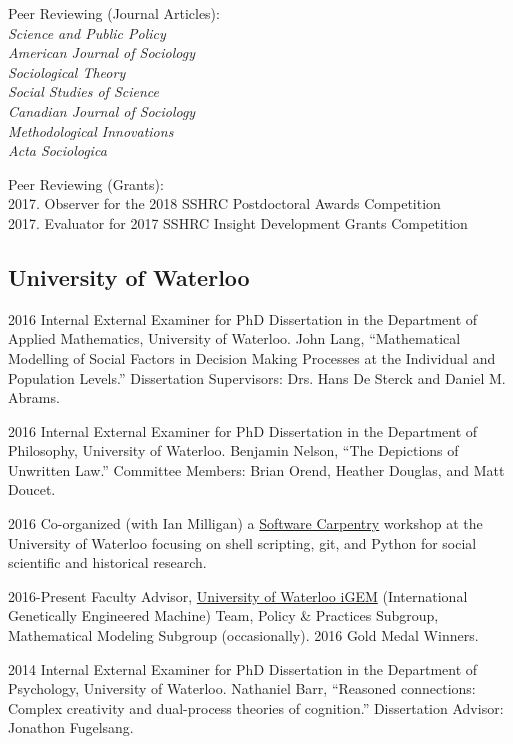 \ind Peer Reviewing (Journal Articles):\\
\emph{Science and Public Policy}\\
\emph{American Journal of Sociology}\\
\emph{Sociological Theory}\\
\emph{Social Studies of Science}\\
\emph{Canadian Journal of Sociology}\\
\emph{Methodological Innovations}\\
\emph{Acta Sociologica}

\ind Peer Reviewing (Grants):\\
2017. Observer for the 2018 SSHRC Postdoctoral Awards Competition\\
2017. Evaluator for 2017 SSHRC Insight Development Grants Competition

\subsection{University of Waterloo}\label{university-of-waterloo}



\item 2016 Internal External Examiner for PhD Dissertation in the Department of Applied Mathematics, University of Waterloo. John Lang, ``Mathematical Modelling of Social Factors in Decision Making Processes at the Individual and Population Levels.'' Dissertation Supervisors: Drs. Hans De Sterck and Daniel M. Abrams.

\item 2016 Internal External Examiner for PhD Dissertation in the Department of Philosophy, University of Waterloo. Benjamin Nelson, ``The Depictions of Unwritten Law.'' Committee Members: Brian Orend, Heather Douglas, and Matt Doucet.


\item 2016 Co-organized (with Ian Milligan) a \href{http://software-carpentry.org/}{Software Carpentry} workshop at the University of Waterloo focusing on shell scripting, git, and Python for social scientific and historical research.

\item 2016-Present Faculty Advisor, \href{http://2015.igem.org/Team:Waterloo}{University of Waterloo iGEM} (International Genetically Engineered Machine) Team, Policy \& Practices Subgroup, Mathematical Modeling Subgroup (occasionally). 2016 Gold Medal Winners.

\item 2014 Internal External Examiner for PhD Dissertation in the Department of Psychology, University of Waterloo. Nathaniel Barr, ``Reasoned connections: Complex creativity and dual-process theories of cognition.'' Dissertation Advisor: Jonathon Fugelsang.




